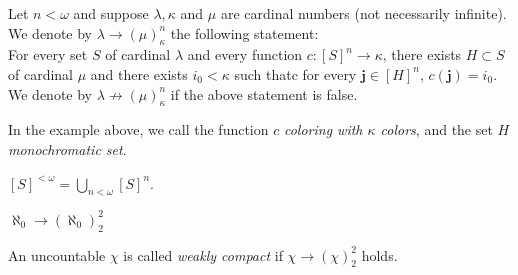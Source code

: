 \begin{definition}
    Let $n<\omega$ and suppose $\lambda, \kappa$ and $\mu$ are cardinal numbers (not necessarily infinite). We denote by $\lambda\to(\mu)_\kappa^n$ the following statement: \\
    For every set $S$ of cardinal $\lambda$ and every function $c:[S]^n\to\kappa$, there exists $H\subset S$ of cardinal $\mu$ and there exists $i_0<\kappa$ such thatc for every $\boldsymbol j\in[H]^n$, $c(\boldsymbol j)=i_0$. \\
    We denote by $\lambda\not\to(\mu)_\kappa^n$ if the above statement is false.
\end{definition}

In the example above, we call the function $c$ \emph{coloring with $\kappa$ colors}, and the set $H$ \emph{monochromatic set}.

\begin{notation}
    $[S]^{<\omega}= \bigcup_{n<\omega}[S]^n$.
\end{notation}

\begin{theorem}
    $\aleph_0\to(\aleph_0)_2^2$
\end{theorem}
\begin{theorem}
    
\end{theorem}

\begin{definition}
    An uncountable $\chi$ is called \emph{weakly compact} if $\chi\to(\chi)_2^2$ holds.
    
\end{definition}